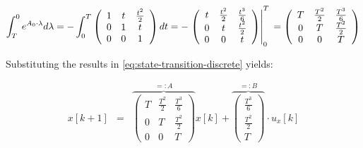 \documentclass[english,ngerman]{KITreprt}
\begin{document}
\begin{equation}
\int^{0}_{T} e^{A_0 \cdot \lambda} d\lambda =  -\int^{T}_{0} \left(\begin{array}{ccc}1 & t & \frac{t^2}{2}\\0 & 1 & t\\ 0 & 0 & 1\end{array}\right) dt
                                            =  -\left.\left(\begin{array}{ccc} %
                                                          t & \frac{t^2}{2} & \frac{t^3}{6} \\ %
                                                          0 & t             & \frac{t^2}{2} \\ %
                                                          0 & 0             & t %
                                                 \end{array}\right)\right|_{0}^{T}\\
                                            =   \left(\begin{array}{ccc} %
                                                          T & \frac{T^2}{2} & \frac{T^3}{6} \\ %
                                                          0 & T             & \frac{T^2}{2} \\ %
                                                          0 & 0             & T %
                                                \end{array}\right)
\end{equation}

Substituting the results in \ref{eq:state-transition-discrete} yields:

\begin{eqnarray} \label{eq:state-transition-result}
x[k+1] & = &  \overbrace{\left(\begin{array}{ccc} %
                     T & \frac{T^2}{2} & \frac{T^3}{6} \\ %
                     0 & T             & \frac{T^2}{2} \\ %
                     0 & 0             & T %
               \end{array}\right)}^{=: A} x[k]
             + \overbrace{\left(\begin{array}{ccc} %
                      \frac{T^3}{6} \\ %
                      \frac{T^2}{2} \\ %
                      T %
               \end{array}\right)}^{=: B} \cdot u_x[k]
\end{eqnarray}
\end{document}
